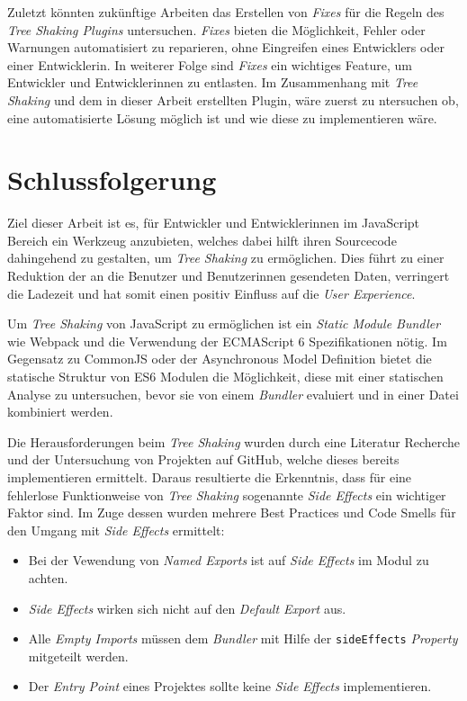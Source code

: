 Zuletzt könnten zukünftige Arbeiten das Erstellen von \textit{Fixes} für die Regeln des \textit{Tree Shaking Plugins} untersuchen. \textit{Fixes} bieten die Möglichkeit, Fehler oder Warnungen automatisiert zu reparieren, ohne Eingreifen eines Entwicklers oder einer Entwicklerin. In weiterer Folge sind \textit{Fixes} ein wichtiges Feature, um Entwickler und Entwicklerinnen zu entlasten. Im Zusammenhang mit \textit{Tree Shaking} und dem in dieser Arbeit erstellten Plugin, wäre zuerst zu ntersuchen ob, eine automatisierte Lösung möglich ist und wie diese zu implementieren wäre.

\section{Schlussfolgerung}

Ziel dieser Arbeit ist es, für Entwickler und Entwicklerinnen im JavaScript Bereich ein Werkzeug anzubieten, welches dabei hilft ihren Sourcecode dahingehend zu gestalten, um \textit{Tree Shaking} zu ermöglichen. Dies führt zu einer Reduktion der an die Benutzer und Benutzerinnen gesendeten Daten, verringert die Ladezeit und hat somit einen positiv Einfluss auf die \textit{User Experience}.

Um \textit{Tree Shaking} von JavaScript zu ermöglichen ist ein \textit{Static Module Bundler} wie Webpack und die Verwendung der ECMAScript 6 Spezifikationen nötig. Im Gegensatz zu CommonJS oder der Asynchronous Model Definition bietet die statische Struktur von ES6 Modulen die Möglichkeit, diese mit einer statischen Analyse zu untersuchen, bevor sie von einem \textit{Bundler} evaluiert und in einer Datei kombiniert werden.

Die Herausforderungen beim \textit{Tree Shaking} wurden durch eine Literatur Recherche und der Untersuchung von Projekten auf GitHub, welche dieses bereits implementieren ermittelt. Daraus resultierte die Erkenntnis, dass für eine fehlerlose Funktionweise von \textit{Tree Shaking} sogenannte \textit{Side Effects} ein wichtiger Faktor sind. Im Zuge dessen wurden mehrere Best Practices und Code Smells für den Umgang mit \textit{Side Effects} ermittelt:

\begin{itemize}
\item Bei der Vewendung von \textit{Named Exports} ist auf \textit{Side Effects} im Modul zu achten.
\item \textit{Side Effects} wirken sich nicht auf den \textit{Default Export} aus.
\item Alle \textit{Empty Imports} müssen dem \textit{Bundler} mit Hilfe der \lstinline{sideEffects} \textit{Property} mitgeteilt werden.
\item Der \textit{Entry Point} eines Projektes sollte keine  \textit{Side Effects} implementieren.
\end{itemize}

